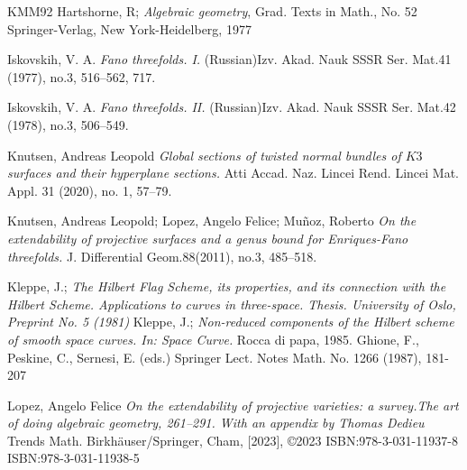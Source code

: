 \documentclass[11pt,twoside]{amsart}
\theoremstyle{plain}
\numberwithin{equation}{section}
\theoremstyle{definition}
\begin{document}
\begin{thebibliography}{KMM92}
Hartshorne, R; \emph{Algebraic geometry}, 
Grad. Texts in Math., No. 52
Springer-Verlag, New York-Heidelberg, 1977

\color{black}
  




Iskovskih, V. A.
\emph{Fano threefolds. I.}
(Russian)Izv. Akad. Nauk SSSR Ser. Mat.41 (1977), no.3, 516–562, 717.

Iskovskih, V. A.
\emph{Fano threefolds. II.}
(Russian)Izv. Akad. Nauk SSSR Ser. Mat.42 (1978), no.3, 506–549.



Knutsen, Andreas Leopold
\emph{Global sections of twisted normal bundles of $K3$ surfaces and their hyperplane sections.}
Atti Accad. Naz. Lincei Rend. Lincei Mat. Appl. 31 (2020), no. 1, 57–79.


Knutsen, Andreas Leopold; Lopez, Angelo Felice; Muñoz, Roberto
\emph{On the extendability of projective surfaces and a genus bound for Enriques-Fano threefolds.}
J. Differential Geom.88(2011), no.3, 485–518.

Kleppe, J.; 
\emph{The Hilbert Flag Scheme, its properties, and its connection with the Hilbert Scheme. Applications to curves in three-space. Thesis. University of Oslo, Preprint No. 5 (1981)}
Kleppe, J.;
\emph{Non-reduced components of the Hilbert scheme of smooth space curves. In: Space Curve.}
Rocca di papa, 1985. Ghione, F., Peskine, C., Sernesi, E. (eds.) Springer Lect. Notes Math. No. 1266 (1987), 181-207



  












\color{black}



Lopez, Angelo Felice
\emph{On the extendability of projective varieties: a survey.The art of doing algebraic geometry, 261–291. With an appendix by Thomas Dedieu}
Trends Math. Birkhäuser/Springer, Cham, [2023], ©2023 ISBN:978-3-031-11937-8
ISBN:978-3-031-11938-5



\end{thebibliography}
\end{document}
